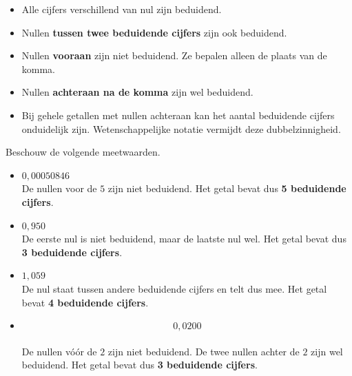 \documentclass{ximera}
\begin{document}
\begin{itemize}
    \item Alle cijfers verschillend van nul zijn beduidend.

    \item Nullen \textbf{tussen twee beduidende cijfers} zijn ook beduidend.

    \item Nullen \textbf{vooraan} zijn niet beduidend. Ze bepalen alleen de
    plaats van de komma.

    \item Nullen \textbf{achteraan na de komma} zijn wel beduidend.

    \item Bij gehele getallen met nullen achteraan kan het aantal beduidende
    cijfers onduidelijk zijn. Wetenschappelijke notatie vermijdt deze
    dubbelzinnigheid.
\end{itemize}


\begin{voorbeeld}

Beschouw de volgende meetwaarden.

\begin{itemize}

    \item
    \(
    0{,}00050846
    \) \\
    De nullen voor de $5$ zijn niet beduidend. Het getal bevat dus
    \textbf{5 beduidende cijfers}.

    \item
    \(
    0{,}950
    \) \\
    De eerste nul is niet beduidend, maar de laatste nul wel.
    Het getal bevat dus \textbf{3 beduidende cijfers}.

    \item
    \(
    1{,}059
    \) \\
    De nul staat tussen andere beduidende cijfers en telt dus mee.
    Het getal bevat \textbf{4 beduidende cijfers}.

    \item
    \[
    0{,}0200
    \] \\
    De nullen vóór de $2$ zijn niet beduidend. De twee nullen achter de $2$
    zijn wel beduidend. Het getal bevat dus \textbf{3 beduidende cijfers}.

\end{itemize}

\end{voorbeeld}
\end{document}
